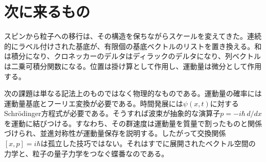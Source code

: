 \section{次に来るもの}

スピンから粒子への移行は、その構造を保ちながらスケールを変えてきた。連続的にラベル付けされた基底が、有限個の基底ベクトルのリストを置き換える。和は積分になり、クロネッカーのデルタはディラックのデルタになり、列ベクトルは二乗可積分関数になる。位置は掛け算として作用し、運動量は微分として作用する。

次の課題は単なる記法上のものではなく物理的なものである。運動量の確率には運動量基底とフーリエ変換が必要である。時間発展には\(\psi(x,t)\)に対するSchr\"odinger方程式が必要である。そうすれば波束が抽象的な演算子\(p=-i\hbar\,d/dx\)を運動に結びつける。すなわち、その群速度は運動量を質量で割ったものと関係づけられ、並進対称性が運動量保存を説明する。したがって交換関係\([x,p]=i\hbar\)は孤立した技巧ではない。それはすでに展開されたベクトル空間の力学と、粒子の量子力学をつなぐ蝶番なのである。
